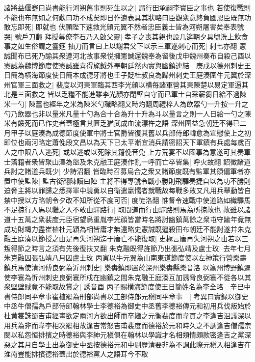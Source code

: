 諸將益偃蹇曰尚書能行河朔舊事則死生以之|{
	謂行田承嗣李寶臣之事也}
若使復戰則不能也布無如之何歎曰功不成矣即日作遺表具其狀略曰臣觀衆意終負國恩臣既無功敢忘即死|{
	即就也}
伏願陛下速救光顔元翼不然者忠臣義士皆為河朔屠害矣奉表號哭|{
	號戶刀翻}
拜授幕僚李石乃入啟父靈|{
	孝子之喪其親也設几筵朝夕具盥洗上飲食事之如生俗謂之靈筵}
抽刀而言曰上以謝君父下以示三軍遂刺心而死|{
	刺七亦翻}
憲誠聞布已死乃諭其衆遵河北故事衆悦擁憲誠還魏奉為留後戊申魏州奏布自殺己酉以憲誠為魏博節度使憲誠雖喜得旄鉞外奉朝廷然内實與幽鎮連結　庚戌以德州刺史王日簡為横海節度使日簡本成德牙將也壬子貶杜叔良為歸州刺史王庭湊圍牛元翼於深州官軍三面救之|{
	裴度以河東軍臨其西李光顔以横每諸軍營其東陳楚以易定軍逼其北是三面救之}
皆以乏糧不能進雖李光顔亦閉壁自守而已軍士自采薪芻日給不過陳米一勺|{
	陳舊也經年之米為陳米勺職略翻又時灼翻周禮梓人為飲器勺一升按一升之勺乃飲器也非以量米凡量十勺為合十合為升十升為斗以量言之則一人日給一勺之陳米有餒死而已作史者蓋極言其匱乏猶武成血流漂杵之語}
深州圍益急朝廷不得已二月甲子以庭湊為成德節度使軍中將士官爵皆復其舊以兵部侍郎韓愈為宣慰使上之初即位也兩河略定蕭俛段文昌以為天下已太平漸宜消兵請密詔天下軍鎮有兵處每歲百人之中限八人逃死|{
	或以逃或以死除其籍俛音免}
上方荒宴不以國事為意遂可其奏軍士落籍者衆皆聚山澤為盜及朱克融王庭湊作亂一呼而亡卒皆集|{
	呼火故翻}
詔徵諸道兵討之諸道兵既少|{
	少詩沼翻}
皆臨時召募烏合之衆又諸節度既有監軍其領偏軍者亦置中使監陳|{
	監古銜翻陳讀曰陣}
主將不得專號令戰小勝則飛驛奏捷自以為功不勝則迫脅主將以罪歸之悉擇軍中驍勇以自衛遣羸懦者就戰故每戰多敗又凡用兵舉動皆自禁中授以方略朝令夕改不知所從不度可否|{
	度徒洛翻}
惟督令速戰中使道路如織驛馬不足掠行人馬以繼之人不敢由驛路行|{
	取間道而行由驛路則馬為所掠故也}
故雖以諸道十五萬之衆裴度元臣宿望烏重胤李光顔皆當時名將討幽鎮萬餘之衆屯守踰年竟無成功財竭力盡崔植杜元穎為相皆庸才無遠略史憲誠既逼殺田布朝廷不能討遂并朱克融王庭湊以節授之由是再失河朔迄于唐亡不能復取|{
	史極言唐再失河朔之由若以三叛得節之時言之須有先後復扶又翻}
朱克融既得旌節乃出張弘靖及盧士玫|{
	去年七月朱克融囚張弘靖八月囚盧士玫}
丙寅以牛元翼為山南東道節度使以左神策行營樂壽鎮兵馬使清河傅良弼為沂州刺史|{
	樂夀鎮即置於深州樂夀縣樂音洛}
以瀛州博野鎮遏使李寰為忻州刺史良弼寰所戍在幽鎮之間朱克融王庭湊互加誘脅良弼寰不從各以其衆堅壁賊竟不能取故賞之|{
	誘音酉}
丙子賜横海節度使王日簡姓名為李全略　辛巳中書侍郎同平章事崔植罷為刑部尚書以工部侍郎元稹同平章事　|{
	考異曰實録以御史中丞牛僧孺為戶部侍郎翰林學士李德裕為御史中丞舊李德裕傳元和初用兵伐叛始於杜黄裳誅蜀吉甫經畫欲定兩河方欲出師而卒繼之元衡裴度而韋貫之李逢吉沮議深以用兵為非而韋李相次罷相故逢吉常怒吉甫裴度而德裕於元和時久之不調逢吉僧孺宗閔以私怨恒排擯之時德裕與李紳元稹俱在翰林以學識才名相類情頗款密逢吉之黨深惡之其月自學士出為御史中丞按德裕元和中剔歷清要非為不調此際元稹入相逢吉在淮南豈能排擯德裕蓋出於德裕黨人之語耳今不取}
